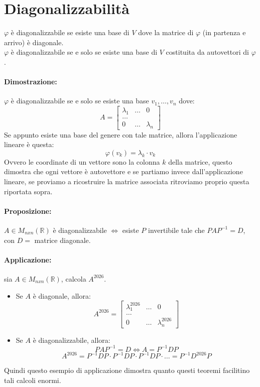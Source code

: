 \documentclass[12pt,a4paper]{article}
\let\oldsection\section
\renewcommand{\section}{\clearpage\oldsection}
\begin{document}
\section{Diagonalizzabilità}
$\varphi$ è diagonalizzabile se esiste una base di $V$ dove la matrice di $\varphi$ (in partenza e arrivo) è diagonale.\\
$\varphi$ è diagonalizzabile se e solo se esiste una base di $V$ costituita da autovettori di $\varphi$.
\paragraph{Dimostrazione:} $\varphi$ è diagonalizzabile se e solo se esiste una base $v_1,\ldots,v_n$ dove:\\
\[
A = \begin{bmatrix}
  \lambda_1 & \ldots & 0\\
  \ldots\\
  0 & \ldots & \lambda_n
\end{bmatrix}
\]
Se appunto esiste una base del genere con tale matrice, allora l'applicazione lineare è questa:
\[
\varphi(v_k) = \lambda_k \cdot v_k
\]
Ovvero le coordinate di un vettore sono la colonna $k$ della matrice, questo dimostra che ogni vettore è autovettore e se partiamo invece dall'applicazione lineare, se proviamo a ricostruire la matrice associata ritroviamo proprio questa riportata sopra.
\paragraph{Proposizione:} $A \in M_{nxn}(\mathbb{R})$ è diagonalizzabile $\Leftrightarrow$ esiste $P$ invertibile tale che $PAP^{-1} = D$, con $D = $ matrice diagonale.
\paragraph{Applicazione:} sia $A \in M_{nxn}(\mathbb{R})$, calcola $A^{2026}$.\\
\begin{itemize}
  \item Se $A$ è diagonale, allora:
  \[
  A^{2026} = \begin{bmatrix}
    \lambda_1^{2026} & \ldots & 0\\
    \ldots\\
    0 & \ldots & \lambda_n^{2026}
  \end{bmatrix}
  \]
  \item Se $A$ è diagonalizzabile, allora:
  \[
  PAP^{-1} = D \Leftrightarrow A = P^{-1}DP
  \]
  \[
  A^{2026} = P^{-1}DP \cdot P^{-1}DP \cdot P^{-1}DP \cdot \ldots = P^{-1}D^{2026}P
  \]
\end{itemize}
Quindi questo esempio di applicazione dimostra quanto questi teoremi facilitino tali calcoli enormi.
\end{document}

